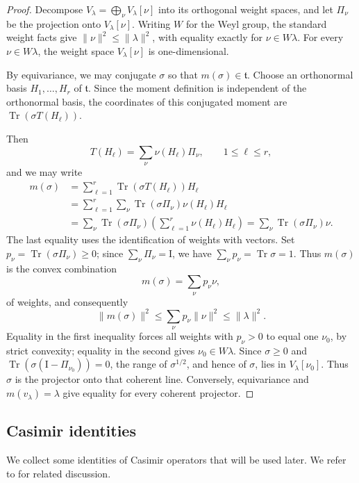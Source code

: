 \documentclass[11pt,reqno]{amsart}
\numberwithin{equation}{section}
\theoremstyle{plain}
\theoremstyle{remark}
\newcommand{\Id}{\mathrm I}
\newcommand{\tr}{\operatorname{Tr}}
\newcommand{\norm}[1]{\lVert#1\rVert}
\begin{document}
\begin{proof}
Decompose $V_\lambda=\bigoplus_\nu V_\lambda[\nu]$ into its orthogonal weight
spaces, and let $\Pi_\nu$ be the projection onto $V_\lambda[\nu]$.
Writing $W$ for the Weyl group, the standard weight facts give
$\norm\nu^2\le\norm{\lambda}^2$, with equality exactly for $\nu\in W\lambda$.
For every $\nu\in W\lambda$, the weight space $V_\lambda[\nu]$ is
one-dimensional.

By equivariance, we may conjugate $\sigma$ so that $m(\sigma)\in\mathfrak t$.
Choose an orthonormal basis $H_1,\ldots,H_r$ of $\mathfrak t$.
Since the moment definition is independent of the orthonormal basis,
the coordinates of this conjugated moment are $\tr(\sigma T(H_\ell))$.

 Then
\[
 T(H_\ell)=\sum_\nu\nu(H_\ell)\Pi_\nu,\qquad 1\le\ell \le r,
\]
and we may write
\begin{align*}
 m(\sigma)
 &=\sum_{\ell=1}^r\tr(\sigma T(H_\ell))H_\ell\\
 &=\sum_{\ell=1}^r\sum_\nu
       \tr(\sigma\Pi_\nu)\nu(H_\ell)H_\ell\\
 &=\sum_\nu\tr(\sigma\Pi_\nu)
       \left(\sum_{\ell=1}^r\nu(H_\ell)H_\ell\right)
  =\sum_\nu\tr(\sigma\Pi_\nu)\nu.
\end{align*}
The last equality uses the identification of weights with vectors.
Set $p_\nu=\tr(\sigma\Pi_\nu)\ge0$; since
$\sum_\nu\Pi_\nu=\Id$, we have $\sum_\nu p_\nu=\tr\sigma=1$.
Thus $m(\sigma)$ is the convex combination
\[
 m(\sigma)=\sum_\nu p_\nu\nu,
\]
of weights, and consequently
\[
 \norm{m(\sigma)}^2
 \le\sum_\nu p_\nu\norm\nu^2\le\norm{\lambda}^2.
\]
Equality in the first inequality forces all weights with $p_\nu>0$
to equal one $\nu_0$, by strict convexity; equality in the second gives
$\nu_0\in W\lambda$.  Since $\sigma\ge0$ and
$\tr(\sigma(\Id-\Pi_{\nu_0}))=0$, the range of $\sigma^{1/2}$, and hence
of $\sigma$, lies in $V_\lambda[\nu_0]$.  Thus $\sigma$ is the projector onto
that coherent line.  Conversely, equivariance and
$m(v_\lambda)=\lambda$ give equality for every coherent projector.
\end{proof}

\subsection{Casimir identities}

We collect some identities of Casimir operators that will be used later.
We refer to \cite{Sugita} for related discussion.
\end{document}
